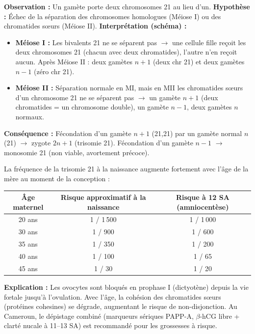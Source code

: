 \documentclass[11pt]{article}
\begin{document}
\begin{experience}
\textbf{Observation :} Un gamète porte deux chromosomes 21 au lieu d'un.
\textbf{Hypothèse :} Échec de la séparation des chromosomes homologues (Méiose I) ou des chromatides sœurs (Méiose II).
\textbf{Interprétation (schéma) :}
\begin{itemize}
    \item \textbf{Méiose I :} Les bivalents 21 ne se séparent pas $\to$ une cellule fille reçoit les deux chromosomes 21 (chacun avec deux chromatides), l'autre n'en reçoit aucun. Après Méiose II : deux gamètes $n+1$ (deux chr 21) et deux gamètes $n-1$ (zéro chr 21).
    \item \textbf{Méiose II :} Séparation normale en MI, mais en MII les chromatides sœurs d'un chromosome 21 ne se séparent pas $\to$ un gamète $n+1$ (deux chromatides = un chromosome double), un gamète $n-1$, deux gamètes $n$ normaux.
\end{itemize}
\textbf{Conséquence :} Fécondation d'un gamète $n+1$ (21,21) par un gamète normal $n$ (21) $\to$ zygote $2n+1$ (trisomie 21). Fécondation d'un gamète $n-1$ $\to$ monosomie 21 (non viable, avortement précoce).
\end{experience}

\begin{savaistu}
La fréquence de la trisomie 21 à la naissance augmente fortement avec l'âge de la mère au moment de la conception :
\begin{center}
\begin{tabular}{|c|c|c|}\hline
\textbf{Âge maternel} & \textbf{Risque approximatif à la naissance} & \textbf{Risque à 12 SA (amniocentèse)} \\ \hline
20 ans & 1 / 1\,500 & 1 / 1\,000 \\ \hline
30 ans & 1 / 900 & 1 / 600 \\ \hline
35 ans & 1 / 350 & 1 / 200 \\ \hline
40 ans & 1 / 100 & 1 / 65 \\ \hline
45 ans & 1 / 30 & 1 / 20 \\ \hline
\end{tabular}
\end{center}
\textbf{Explication :} Les ovocytes sont bloqués en prophase I (dictyotène) depuis la vie fœtale jusqu'à l'ovulation. Avec l'âge, la cohésion des chromatides sœurs (protéines cohesines) se dégrade, augmentant le risque de non-disjonction. Au Cameroun, le dépistage combiné (marqueurs sériques PAPP-A, $\beta$-hCG libre + clarté nucale à 11--13 SA) est recommandé pour les grossesses à risque.
\end{savaistu}
\end{document}
